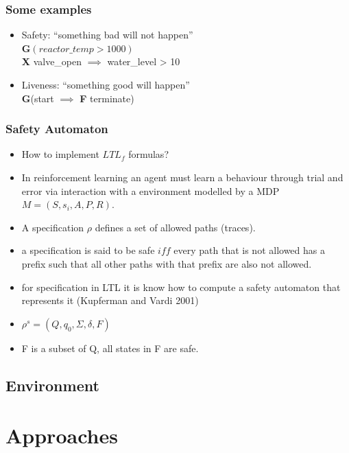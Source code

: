 \documentclass[kul]{kulakbeamer}
\begin{document}
\begin{frame}
\frametitle{Some examples}
\begin{itemize}
    \item Safety: “something bad will not happen” \\
    \textbf{G}$(reactor\_temp> 1000)$ \\
    \textbf{X} valve\_open $\implies$ water\_level > 10 
    \item Liveness: “something good will happen” \\
    \textbf{G}(start $\implies$ \textbf{F} terminate)
\end{itemize}
\end{frame}


\begin{frame}
\frametitle{Safety Automaton}
 \begin{itemize}
     \item How to implement $LTL_f$ formulas?
     \item In reinforcement learning an agent must learn a behaviour through trial and error via interaction with a
     environment modelled by a MDP $M=(S,s_i,A,P,R)$.
     \item A specification $\rho$ defines a set of allowed paths (traces). 
     \item a specification is said to be safe $iff$ every path that is not allowed has a prefix such that all other paths with that prefix are also not allowed.
     \item for specification in LTL it is know how to compute a safety automaton that represents it (Kupferman and Vardi 2001) 
     \item $\rho^{s} = (Q,q_0,\Sigma, \delta, F)$
     \item F is a subset of Q, all states in F are safe.
 \end{itemize}
\end{frame}
\subsection{Environment}

\section{Approaches}
\end{document}
